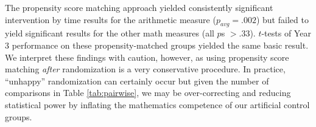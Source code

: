 \documentclass[11pt]{article}
\begin{document}
The propensity score matching approach yielded consistently significant intervention by time results for the arithmetic measure ($p_{avg} = .002$) but failed to yield significant results for the other math measures (all $p$s $>.33$). $t$-tests of Year 3 performance on these propensity-matched groups yielded the same basic result. We interpret these findings with caution, however, as using propensity score matching \emph{after} randomization is a very conservative procedure. In practice, ``unhappy'' randomization can certainly occur but given the number of comparisons in Table \ref{tab:pairwise}, we may be over-correcting and reducing statistical power by inflating the mathematics competence of our artificial control groups. 

\newpage


 
\end{document}
